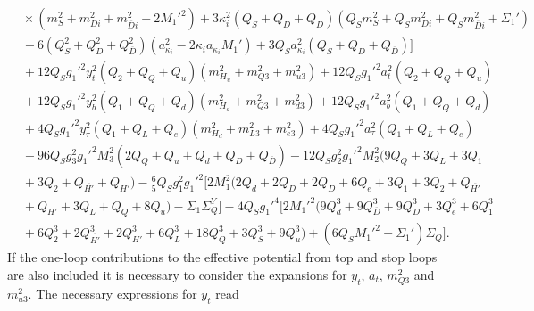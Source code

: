 \documentclass[preprint,amsmath,amssymb,aps,superscriptaddress,prd,showpacs,floatfix,nofootinbib]{revtex4-1}
\begin{document}
\begin{subequations}
\begin{align}
&{}\times\left ( m_S^2+m_{Di}^2+m_{\overline{D}i}^2+2M_1'^2\right )+3\kappa_i^2\left ( Q_S+Q_D+Q_{\overline{D}}\right )\left ( Q_Sm_S^2+Q_Sm_{Di}^2+Q_Sm_{\overline{D}i}^2+\Sigma_1'\right )\nonumber\\
&{}-6\left ( Q_S^2+Q_D^2+Q_{\overline{D}}^2\right )\left ( a_{\kappa_i}^2-2\kappa_i a_{\kappa_i}M_1'\right )+3Q_Sa_{\kappa_i}^2\left ( Q_S+Q_D+Q_{\overline{D}}\right )\Big ]\nonumber\\
&{}+12Q_Sg_1'^2y_t^2\left ( Q_2+Q_Q+Q_u\right )\left ( m_{H_u}^2+m_{Q3}^2+m_{u3}^2\right )+12Q_Sg_1'^2a_t^2\left ( Q_2+Q_Q+Q_u\right )\nonumber\\
&{}+12Q_Sg_1'^2y_b^2\left ( Q_1+Q_Q+Q_d\right )\left ( m_{H_d}^2+m_{Q3}^2+m_{d3}^2\right )+12Q_Sg_1'^2a_b^2\left ( Q_1+Q_Q+Q_d\right )\nonumber\\
&{}+4Q_Sg_1'^2y_\tau^2\left ( Q_1+Q_L+Q_e\right )\left ( m_{H_d}^2+m_{L3}^2+m_{e3}^2\right )+4Q_Sg_1'^2a_\tau^2\left ( Q_1+Q_L+Q_e\right )\nonumber\\
&{}-96Q_Sg_3^2g_1'^2M_3^2\left ( 2Q_Q+Q_u+Q_d+Q_D+Q_{\overline{D}}\right )-12Q_Sg_2^2g_1'^2M_2^2\big ( 9Q_Q+3Q_L+3Q_1\nonumber\\
&{}+3Q_2+Q_{\overline{H'}}+Q_{H'}\big )-\frac{6}{5}Q_Sg_1^2g_1'^2\Big [ 2M_1^2\big ( 2Q_d+2Q_{\overline{D}}+2Q_D+6Q_e+3Q_1+3Q_2+Q_{\overline{H'}}\nonumber\\
&{}+Q_{H'}+3Q_L+Q_Q+8Q_u\big )-\Sigma_1\Sigma_Q^Y\Big ]-4Q_Sg_1'^4\Big [ 2M_1'^2\big ( 9Q_d^3+9Q_{\overline{D}}^3+9Q_D^3+3Q_e^3+6Q_1^3\nonumber\\
&{}+6Q_2^3+2Q_{\overline{H'}}^3+2Q_{H'}^3+6Q_L^3+18Q_Q^3+3Q_S^3+9Q_u^3\big )+\left ( 6Q_SM_1'^2-\Sigma_1'\right )\Sigma_Q\Big ].\label{eq:USSMms2Ot2Coeff}
\end{align}
\end{subequations}
If the one-loop contributions to the effective potential from top and stop loops are also included it is necessary to consider the expansions for $y_t$, $a_t$, $m_{Q3}^2$ and $m_{u3}^2$. The necessary expressions for $y_t$ read
\end{document}
